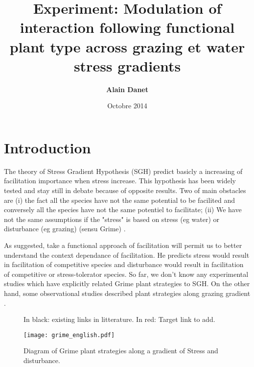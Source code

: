 \documentclass[12pt]{article} %
\title{Experiment: Modulation of interaction following functional plant type across grazing et water stress gradients}
\author{\textbf{Alain Danet}}
\date{Octobre 2014}
\begin{document}
\maketitle


\part{Introduction}
The theory of Stress Gradient Hypothesis (SGH) predict basicly a increasing of facilitation importance when stress increase. This hypothesis has been widely tested and stay still in debate because of opposite results. Two of main obstacles are (i) the fact all the species have not the same potential to be facilited and conversely all the species have not the same potentiel to facilitate; (ii) We have not the same assumptions if the "stress" is based on stress (eg water) or disturbance (eg grazing) (sensu Grime) \citep{Maestre2009}.

As \citet{Butterfield2013} suggested, take a functional approach of facilitation will permit us to better understand the context dependance of facilitation. He predicts stress would result in facilitation of competitive species and disturbance would result in facilitation of competitive or stress-tolerator species. So far, we don't know any experimental studies which have explicitly related Grime plant strategies to SGH. On the other hand, some observational studies described plant strategies along grazing gradient \citep{DIAZ2007}. 

\begin{figure}
\begin{center}
\end{center}
\caption{In black: existing links in litterature. In red: Target link to add.}
\end{figure}


\begin{figure}
\begin{center}
\texttt{[image: grime\_english.pdf]}
\end{center}
\caption{Diagram of Grime plant strategies along a gradient of Stress and disturbance.\label{Grime}}
\end{figure}
\end{document}
